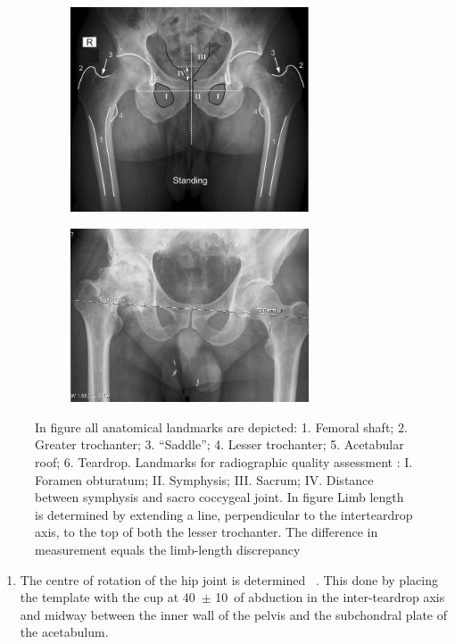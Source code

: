 \documentclass[whitelogo]{tudelft-report}
\begin{document}
{\begin{figure}[!htb]
	\centering
	\begin{subfigure}[b]{0.5\linewidth}
		\centering\includegraphics[width=200pt]{preoperativehipscan3.jpg}
		\caption{\label{fig:fig1}}
	\end{subfigure}%
	\begin{subfigure}[b]{0.5\linewidth}
		\centering\includegraphics[width=200pt]{preoperativehipscan.jpg}
		\caption{\label{fig:fig2}}
	\end{subfigure}
	\caption{In figure  all anatomical landmarks are depicted: 1. Femoral shaft; 2. Greater trochanter; 3. “Saddle”; 4. Lesser trochanter; 5. Acetabular roof; 6. Teardrop. Landmarks for radiographic quality assessment : I. Foramen obturatum; II. Symphysis; III. Sacrum; IV. Distance between symphysis and sacro coccygeal joint. In figure  Limb length is determined by extending a line, perpendicular to the interteardrop axis, to the top of both the lesser trochanter. The difference in measurement equals the limb-length discrepancy~\cite{scheerlinck2010primary} }
	\end{figure}
	\begin{enumerate}
		\item The centre of rotation of the hip joint is determined ~\cite{scheerlinck2010primary}. This done by placing the template with the cup at 40\degree    ~$\pm$ 10\degree~of abduction in the inter-teardrop axis and midway between the inner wall of the pelvis and the subchondral plate of the acetabulum.        

\end{enumerate}}
\end{document}
